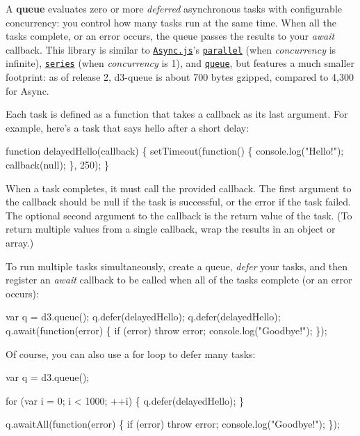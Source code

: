 A {\bfseries queue} evaluates zero or more {\itshape deferred} asynchronous tasks with configurable concurrency\+: you control how many tasks run at the same time. When all the tasks complete, or an error occurs, the queue passes the results to your {\itshape await} callback. This library is similar to \href{https://github.com/caolan/async}{\tt Async.\+js}’s \href{https://github.com/caolan/async#paralleltasks-callback}{\tt parallel} (when {\itshape concurrency} is infinite), \href{https://github.com/caolan/async#seriestasks-callback}{\tt series} (when {\itshape concurrency} is 1), and \href{https://github.com/caolan/async#queue}{\tt queue}, but features a much smaller footprint\+: as of release 2, d3-\/queue is about 700 bytes gzipped, compared to 4,300 for Async.

Each task is defined as a function that takes a callback as its last argument. For example, here’s a task that says hello after a short delay\+:


\begin{DoxyCode}
function delayedHello(callback) \{
  setTimeout(function() \{
    console.log("Hello!");
    callback(null);
  \}, 250);
\}
\end{DoxyCode}


When a task completes, it must call the provided callback. The first argument to the callback should be null if the task is successful, or the error if the task failed. The optional second argument to the callback is the return value of the task. (To return multiple values from a single callback, wrap the results in an object or array.)

To run multiple tasks simultaneously, create a queue, {\itshape defer} your tasks, and then register an {\itshape await} callback to be called when all of the tasks complete (or an error occurs)\+:


\begin{DoxyCode}
var q = d3.queue();
q.defer(delayedHello);
q.defer(delayedHello);
q.await(function(error) \{
  if (error) throw error;
  console.log("Goodbye!");
\});
\end{DoxyCode}


Of course, you can also use a {\ttfamily for} loop to defer many tasks\+:


\begin{DoxyCode}
var q = d3.queue();

for (var i = 0; i < 1000; ++i) \{
  q.defer(delayedHello);
\}

q.awaitAll(function(error) \{
  if (error) throw error;
  console.log("Goodbye!");
\});
\end{DoxyCode}


